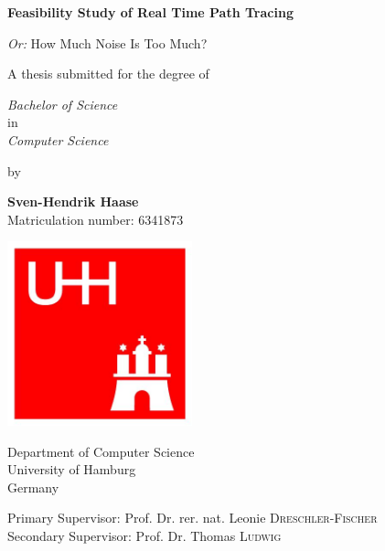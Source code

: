 \begin{titlepage}
    \begin{center}
        \LARGE
        \textbf{Feasibility Study of Real Time Path Tracing}
        
        \vspace{0.5cm}

        \Large
        \textit{Or:} How Much Noise Is Too Much?

        \vspace{0.5cm}
        
        A thesis submitted for the degree of

        \vspace{0.5cm}

        \emph{Bachelor of Science}\\
        in\\
        \emph{Computer Science}
        
        \vspace{0.6cm}

        by

        \vspace{0.3cm}
        
        \textbf{Sven-Hendrik Haase}\\
        {\small Matriculation number: 6341873}
        
        \vspace{0.5cm}
        
        \includegraphics[width=0.4\textwidth]{frontbackmatter/logo_uhh.jpg}
        
        
        \Large
        Department of Computer Science\\
        University of Hamburg\\
        Germany\\

        \vspace{0.8cm}

        \large
        Primary Supervisor: Prof. Dr. rer. nat. Leonie \textsc{Dreschler-Fischer}\\
        Secondary Supervisor: Prof. Dr. Thomas \textsc{Ludwig}
        
    \end{center}
\end{titlepage}
